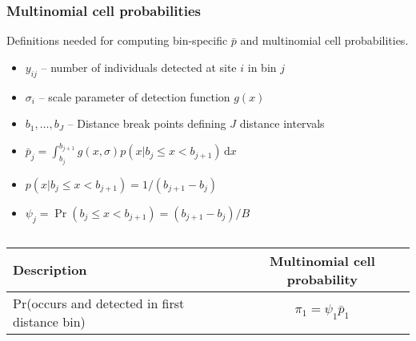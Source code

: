 \documentclass[color=usenames,dvipsnames]{beamer}\usepackage[]{graphicx}\usepackage[]{color}
\begin{document}
\begin{frame}
  \frametitle{Multinomial cell probabilities}
  \small
  Definitions needed for computing \alert{bin-specific} $\bar{p}$ and multinomial cell probabilities.
  \begin{itemize}
  \small
    \setlength\itemsep{1pt}
    \item $y_{ij}$ -- number of individuals detected at site $i$ in bin $j$
    \item $\sigma_i$ -- scale parameter of detection function $g(x)$
    \item $b_1, \dots, b_J$ -- Distance break points defining $J$ distance intervals
    \item $\bar{p}_j = \int_{b_j}^{b_{j+1}} g(x,\sigma)p(x|b_j\le x<b_{j+1})\, \mathrm{d}x$
    \item $p(x|b_j\le x<b_{j+1}) = 1/(b_{j+1}-b_j)$
    \item $\psi_j=\Pr(b_j\le x<b_{j+1})=(b_{j+1}-b_j)/B$ %
  \end{itemize}
  \pause \vfill
  \footnotesize
  \begin{columns}
    \column{0.9\paperwidth}
    \begin{tabular}{lc}
      \hline
      \centering
      Description                       & Multinomial cell probability \\
      \hline
      Pr(occurs and detected in first distance bin)  & $\pi_1 = \psi_1\bar{p}_1$   \\

\end{tabular}
\end{columns}
\end{frame}
\end{document}
